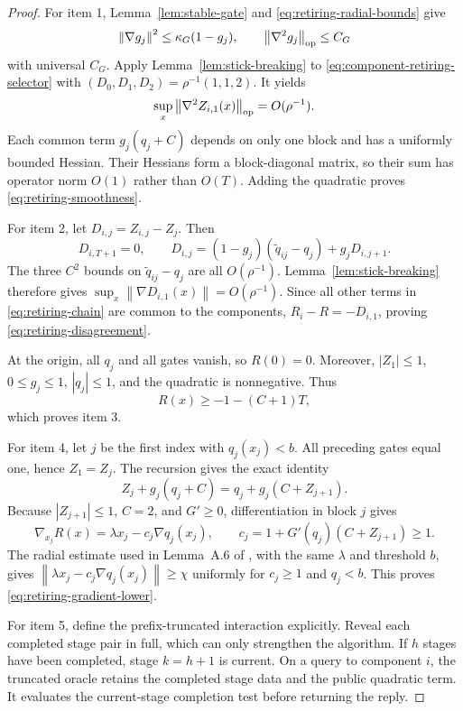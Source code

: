 \documentclass[11pt,a4paper]{article}
\newcommand{\norm}[1]{\left\lVert #1\right\rVert}
\theoremstyle{remark}
\begin{document}
\begin{proof}
For item 1, Lemma~\ref{lem:stable-gate} and
\eqref{eq:retiring-radial-bounds} give
\[
 \norm{\nabla g_j}^2\le\kappa_G(1-g_j),
 \qquad
 \norm{\nabla^2g_j}_{\rm op}\le C_G
\]
with universal $C_G$.  Apply Lemma~\ref{lem:stick-breaking} to
\eqref{eq:component-retiring-selector} with
$(D_0,D_1,D_2)=\rho^{-1}(1,1,2)$.  It yields
\[
 \sup_x\norm{\nabla^2Z_{i,1}(x)}_{\rm op}=O(\rho^{-1}).
\]
Each common term $g_j(q_j+C)$ depends on only one block and has a uniformly
bounded Hessian.  Their Hessians form a block-diagonal matrix, so their sum
has operator norm $O(1)$ rather than $O(T)$.  Adding the quadratic proves
\eqref{eq:retiring-smoothness}.

For item 2, let $D_{i,j}=Z_{i,j}-Z_j$.  Then
\begin{equation}
 D_{i,T+1}=0,
 \qquad
 D_{i,j}=(1-g_j)(\widetilde q_{ij}-q_j)+g_jD_{i,j+1}.
 \label{eq:retiring-difference-recursion}
\end{equation}
The three $C^2$ bounds on $\widetilde q_{ij}-q_j$ are all $O(\rho^{-1})$.
Lemma~\ref{lem:stick-breaking} therefore gives
$\sup_x\norm{\nabla D_{i,1}(x)}=O(\rho^{-1})$.  Since all other terms in
\eqref{eq:retiring-chain} are common to the components,
$R_i-R=-D_{i,1}$, proving \eqref{eq:retiring-disagreement}.

At the origin, all $q_j$ and all gates vanish, so $R(0)=0$.  Moreover,
$|Z_1|\le1$, $0\le g_j\le1$, $|q_j|\le1$, and the quadratic is nonnegative.
Thus
\[
 R(x)\ge-1-(C+1)T,
\]
which proves item 3.

For item 4, let $j$ be the first index with $q_j(x_j)<b$.  All preceding
gates equal one, hence $Z_1=Z_j$.  The recursion gives the exact identity
\begin{equation}
 Z_j+g_j(q_j+C)=q_j+g_j(C+Z_{j+1}).
 \label{eq:retiring-gradient-identity}
\end{equation}
Because $|Z_{j+1}|\le1$, $C=2$, and $G'\ge0$, differentiation in block $j$
gives
\[
 \nabla_{x_j}R(x)=\lambda x_j-c_j\nabla q_j(x_j),
 \qquad
 c_j=1+G'(q_j)(C+Z_{j+1})\ge1.
\]
The radial estimate used in Lemma~A.6 of \cite{dense2026}, with the same
$\lambda$ and threshold $b$, gives
$\norm{\lambda x_j-c_j\nabla q_j(x_j)}\ge\chi$ uniformly for
$c_j\ge1$ and $q_j<b$.  This proves \eqref{eq:retiring-gradient-lower}.

For item 5, define the prefix-truncated interaction explicitly.
Reveal each completed stage pair in full, which can only strengthen the
algorithm. If $h$ stages have been completed, stage $k=h+1$ is current.
On a query to component $i$, the truncated oracle retains the completed
stage data and the public quadratic term. It evaluates the current-stage
completion test before returning the reply.


\end{proof}
\end{document}
